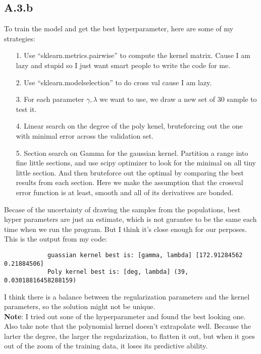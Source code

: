 \documentclass[]{article}
\begin{document}
    \subsection*{A.3.b}
        To train the model and get the best hyperparameter, here are some of my strategies: 
        \begin{enumerate}
            \item[1.] Use ``sklearn.metrics.pairwise'' to compute the kernel matrix. Cause I am lazy and stupid so I just want smart people to write the code for me. 
            \item[2.] Use ``sklearn.modelselection'' to do cross val cause I am lazy. 
            \item[3.] For each parameter $\gamma, \lambda$ we want to use, we draw a new set of 30 sample to test it. 
            \item[4.] Linear search on the degree of the poly kenel, bruteforcing out the one with minimal error across the validation set. 
            \item[5.] Section search on Gamma for the gaussian kernel. Partition a range into fine little sections, and use scipy optimizer to look for the minimal on all tiny little section. And then bruteforce out the optimal by comparing the best results from each section. Here we make the assumption that the crossval error function is at least, smooth and all of its derivatives are bonded. 
        \end{enumerate}
        Becase of the uncertainty of drawing the samples from the populations, best hyper parameters are just an estimate, which is not gurantee to be the same each time when we run the program. But I think it's close enough for our perposes. 
        \\
        This is the output from my code: 
        \begin{verbatim}
            guassian kernel best is: [gamma, lambda] [172.91284562   0.21884506]
            Poly kernel best is: [deg, lambda] (39, 0.03018816458288159)
        \end{verbatim}
        I think there is a balance between the regularization parameters and the kernel parameters, so the solution might not be unique. 
        \\
        \textbf{Note}: I tried out sone of the hyperparameter and found the best looking one. Also take note that the polynomial kernel doesn't extrapolate well. Because the larter the degree, the larger the regularization, to flatten it out, but when it goes out of the zoom of the training data, it loses its predictive ability.
\end{document}
